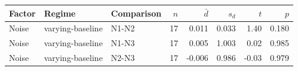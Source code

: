 \begin{tabular}{lllrrrrr}
\toprule
Factor & Regime & Comparison & \(n\) & \(\bar{d}\) & \(s_d\) & \(t\) & \(p\) \\
\midrule
Noise & varying-baseline & N1-N2 & 17 & 0.011 & 0.033 & 1.40 & 0.180 \\
Noise & varying-baseline & N1-N3 & 17 & 0.005 & 1.003 & 0.02 & 0.985 \\
Noise & varying-baseline & N2-N3 & 17 & -0.006 & 0.986 & -0.03 & 0.979 \\
\bottomrule
\end{tabular}
